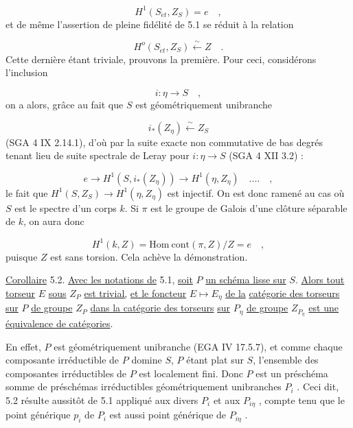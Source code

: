 \begin{equation*}
H^1(S_{\acute{e}t},Z_S) = e \quad ,
\end{equation*}
et de même l'assertion de pleine fidélité de 5.1 se réduit à la relation

\begin{equation*}
H^o(S_{\acute{e}t},Z_S) \stackrel{\sim}{\longleftarrow} Z \quad .
\end{equation*}
Cette dernière étant triviale, prouvons la première. Pour ceci, considérons l'inclusion

\begin{equation*}
i : \eta \longrightarrow S \quad ,
\end{equation*}
on a alors, grâce au fait que $S$ est géométriquement unibranche

\begin{equation*}
i_*(Z_\eta) \stackrel{\sim}{\longleftarrow} Z_S
\end{equation*}
(SGA 4 IX 2.14.1), d'où par la suite exacte non commutative de bas degrés tenant lieu de suite spectrale de Leray pour $i : \eta \longrightarrow S$ (SGA 4 XII 3.2) :

\begin{equation*}
e \longrightarrow H^1(S,i_*(Z_\eta)) \longrightarrow H^1(\eta,Z_\eta) \quad .... \quad ,
\end{equation*}
le fait que $H^1(S,Z_S) \longrightarrow H^1(\eta,Z_\eta)$ est injectif. On est donc ramené au cas où $S$ est le spectre d'un corps $k$. Si $\pi$ est le groupe de Galois d'une clôture séparable de $k$, on aura donc

\begin{equation*}
H^1(k,Z) = \mathrm{Hom}\ \mathrm{cont}(\pi,Z)/Z = e \quad ,
\end{equation*}
puisque $Z$ est sans torsion. Cela achève la démonstration.

\underline{Corollaire} 5.2. \underline{Avec les notations de} 5.1, \underline{soit} $P$ \underline{un schéma lisse sur} $S$. \underline{Alors tout torseur} $E$ \underline{sous} $Z_P$ \underline{est trivial,} \underline{et le foncteur} $E \longmapsto E_\eta$ \underline{de la} \underline{catégorie des torseurs sur} $P$ \underline{de groupe} $Z_P$ \underline{dans la catégorie des torseurs}
\underline{sur} $P_\eta$ \underline{de groupe} $Z_{P_\eta}$ \underline{est une équivalence de catégories}.

En effet, $P$ est géométriquement unibranche (EGA IV 17.5.7), et comme chaque composante irréductible de $P$ domine $S$, $P$ étant plat sur $S$, l'ensemble des composantes irréductibles de $P$ est localement fini. Donc $P$ est un préschéma somme de préschémas irréductibles géométriquement unibranches $P_i$ . Ceci dit, 5.2 résulte aussitôt de 5.1 appliqué aux divers $P_i$ et aux $P_{i\eta}$ , compte tenu que le point générique $p_i$ de $P_i$ est aussi point générique de $P_{i\eta}$ .

